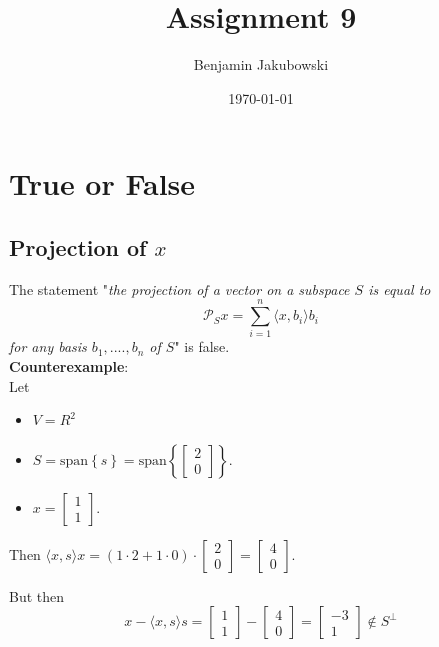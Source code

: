 \documentclass[paper=a4, fontsize=11pt]{scrartcl} %
\title{	Assignment 9}
\author{Benjamin Jakubowski} %
\date{\normalsize\today} %
\numberwithin{equation}{section} %
\numberwithin{figure}{section} %
\numberwithin{table}{section} %
\begin{document}
\maketitle %


\section{True or False}

\subsection{Projection of $x$}

The statement "\emph{the projection of a vector on a subspace $S$ is equal to}
\[\mathcal{P}_{S} x = \sum_{i=1}^{n} \langle x, b_i \rangle b_i \]
\emph{for any basis $b_1, ...., b_n$ of $S$}" is false. \\
\textbf{Counterexample}: \\
Let
\begin{itemize}
\item $V = R^2$
\item $S = \textrm{span}\left\{ s \right\} = \textrm{span}\left\{\left[ \begin{matrix} 2 \\ 0 \end{matrix}\right]\right\}$.
\item $ x = \left[ \begin{matrix} 1 \\ 1 \end{matrix}\right]$.
\end{itemize}

Then $\langle x, s \rangle x = (1\cdot 2 + 1\cdot 0 ) \cdot \left[ \begin{matrix} 2 \\ 0 \end{matrix}\right] = \left[ \begin{matrix} 4 \\ 0 \end{matrix}\right]$.

But then
\[x - \langle x, s \rangle s = \left[ \begin{matrix} 1 \\ 1 \end{matrix}\right] - \left[ \begin{matrix} 4 \\ 0 \end{matrix}\right] = \left[ \begin{matrix} -3 \\ 1 \end{matrix}\right] \notin S^{\bot}\]
\end{document}
